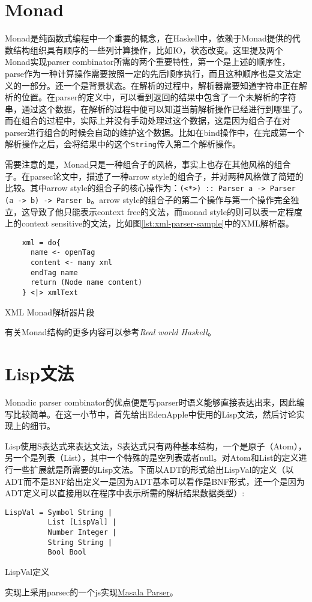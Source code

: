 \section{Monad}

Monad是纯函数式编程中一个重要的概念，在Haskell中，依赖于Monad提供的代数结构组织具有顺序的一些列计算操作，比如IO，状态改变。这里提及两个Monad实现parser combinator所需的两个重要特性，第一个是上述的顺序性，parse作为一种计算操作需要按照一定的先后顺序执行，而且这种顺序也是文法定义的一部分。还一个是背景状态。在解析的过程中，解析器需要知道字符串正在解析的位置。在parser的定义中，可以看到返回的结果中包含了一个未解析的字符串，通过这个数据，在解析的过程中便可以知道当前解析操作已经进行到哪里了。而在组合的过程中，实际上并没有手动处理过这个数据，这是因为组合子在对parser进行组合的时候会自动的维护这个数据。比如在bind操作中，在完成第一个解析操作之后，会将结果中的这个\texttt{String}传入第二个解析操作。

需要注意的是，Monad只是一种组合子的风格，事实上也存在其他风格的组合子。在parsec论文\cite{leijen01parsec}中，描述了一种arrow style的组合子，并对两种风格做了简短的比较。其中arrow style的组合子的核心操作为：\texttt{(<*>) :: Parser a -> Parser (a -> b) -> Parser b}。arrow style的组合子的第二个操作与第一个操作完全独立，这导致了他只能表示context free的文法，而monad style的则可以表一定程度上的context sensitive的文法，比如图\ref{lst:xml-parser-sample}中的XML解析器。

\begin{code}
  \begin{verbatim}
    xml = do{
      name <- openTag
      content <- many xml
      endTag name
      return (Node name content)
    } <|> xmlText
  \end{verbatim}
  \caption{XML Monad解析器片段}
  \label{lst:xml-parser-sample}
\end{code}

有关Monad结构的更多内容可以参考\textit{Real world Haskell\cite{O2008Real}}。

\section{Lisp文法}

Monadic parser combinator的优点便是写parser时语义能够直接表达出来，因此编写比较简单。在这一小节中，首先给出EdenApple中使用的Lisp文法，然后讨论实现上的细节。

Lisp使用S表达式来表达文法，S表达式只有两种基本结构，一个是原子（Atom），另一个是列表（List），其中一个特殊的是空列表或者null。对Atom和List的定义进行一些扩展就是所需要的Lisp文法。下面以ADT的形式给出LispVal的定义（以ADT而不是BNF给出定义一是因为ADT基本可以看作是BNF形式，还一个是因为ADT定义可以直接用以在程序中表示所需的解析结果数据类型）:

\begin{listing}
\begin{verbatim}
LispVal = Symbol String |
          List [LispVal] |
          Number Integer |
          String String |
          Bool Bool
\end{verbatim}
\caption{LispVal定义}
\label{lst:lisp-val-def}
\end{listing}

实现上采用parsec的一个js实现\href{https://github.com/d-plaindoux/parsec}{Masala Parser}。